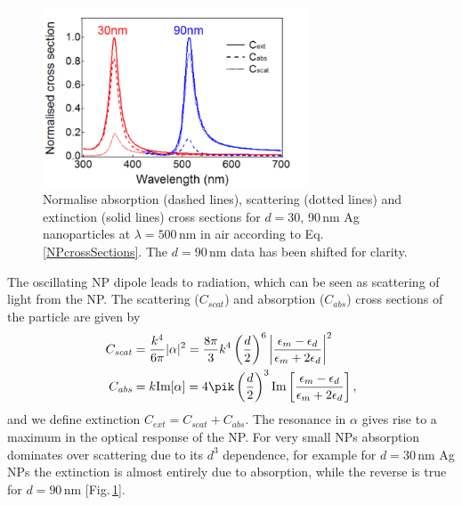 \begin{figure}[h!] 
\centering    
\includegraphics[width=0.7\textwidth]{Fig8}
\caption{Normalise absorption (dashed lines), scattering (dotted lines) and extinction (solid lines) cross sections for $d=30$, 90\,nm Ag nanoparticles at $\lambda=500$\,nm in air according to Eq.\,\ref{NPcrossSections}. The $d=90$\,nm data has been shifted for clarity.}
\label{3Fig8}
\end{figure}

The oscillating NP dipole leads to radiation, which can be seen as scattering of light from the NP. The scattering ($C_{\mathit{scat}}$) and absorption ($C_{\mathit{abs}}$) cross sections of the particle are given by
\begin{subequations}
\label{NPcrossSections}
\begin{align}
C_{\mathit{scat}} &= \frac{k^4}{6\pi}|\alpha|^2 = \frac{8\pi}{3}k^4\left(\frac{d}{2}\right)^6 \left|\frac{\epsilon_m-\epsilon_d}{\epsilon_m+2\epsilon_d}\right|^2 \label{Scat}\\
C_{\mathit{abs}} &= k\textrm{Im}[\alpha] = 4\pik\left(\frac{d}{2}\right)^3\textrm{Im}\left[\frac{\epsilon_m-\epsilon_d}{\epsilon_m+2\epsilon_d}\right] \label{abs} ,
\end{align}
\end{subequations}
and we define extinction $C_{\mathit{ext}} = C_{\mathit{scat}}+C_{\mathit{abs}}$. The resonance in $\alpha$ gives rise to a maximum in the optical response of the NP. For very small NPs absorption dominates over scattering due to its $d^3$ dependence, for example for $d=30$\,nm Ag NPs the extinction is almost entirely due to absorption, while the reverse is true for $d=90$\,nm [Fig.\,\ref{3Fig8}].

